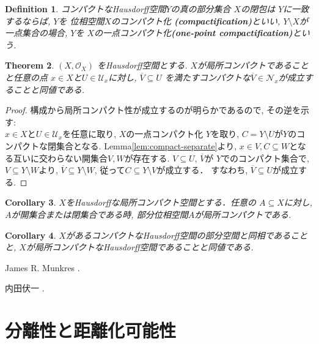 \documentclass[lualatex]{ltjsbook}
\newcommand{\cl}[1]{\overline{ #1}  }
\newtheorem{theorem}{Theorem}[chapter]
\newtheorem{corollary}[theorem]{Corollary}
\newtheorem{definition}[theorem]{Definition}
\theoremstyle{remark}
\theoremstyle{plain}
\begin{document}
\begin{definition}
	コンパクトなHausdorff空間$Y$の真の部分集合 $X$の閉包は $Y$に一致するならば,  
	$Y$を 位相空間$X$のコンパクト化 \textbf{(compactification)}といい,  
	$Y \setminus X$が一点集合の場合, 
	$Y$を $X$の一点コンパクト化\textbf{(one-point compactification)}という.
\end{definition}



\begin{theorem}
	$\left( X ,  \mathcal{O}_{X} \right)$ をHausdorff空間とする. 
	$X$が局所コンパクトであることと任意の点 $x \in X$と$U \in \mathcal{U}_x$に対し,  
	$\overline{V} \subseteq U$ を満たすコンパクトな$\overline{V} \in  \mathcal{N}_x$が成立することと同値である.
\end{theorem}

\begin{proof}
	構成から局所コンパクト性が成立するのが明らかであるので,  その逆を示す:\\
	$x \in X$と$U \in \mathcal{U}_x$を任意に取り,  $X$の一点コンパクト化 $Y$を取り,  
	$C = Y \setminus U$が$Y$のコンパクトな閉集合となる. 
	Lemma\ref{lem:compact-separate}より, 
	$x \in V,  C \subseteq W $となる互いに交わらない開集合$V , W$が存在する. 
	$V \subseteq U$,  $\cl{V}$が $Y$でのコンパクト集合で,  
	$V \subseteq Y \setminus W$より,  
	$\cl{V} \subseteq Y \setminus W$, 
	従って$C \subseteq Y \setminus V$が成立する． 
	すなわち,  $\cl{V} \subseteq U$が成立する.
\end{proof}

\begin{corollary}
	$X$をHausdorffな局所コンパクト空間とする．任意の $A \subseteq X$に対し,  $A$が開集合または閉集合である時,  部分位相空間$A$が局所コンパクトである.
\end{corollary}

\begin{corollary}
	$X$があるコンパクトなHausdorff空間の部分空間と同相であることと,   $X$が局所コンパクトなHausdorff空間であることと同値である.
\end{corollary}





\begin{thebibliography}{99}
	 James R. Munkres 
	.

	 内田伏一 
	.
\end{thebibliography}


\chapter{分離性と距離化可能性}
\end{document}
